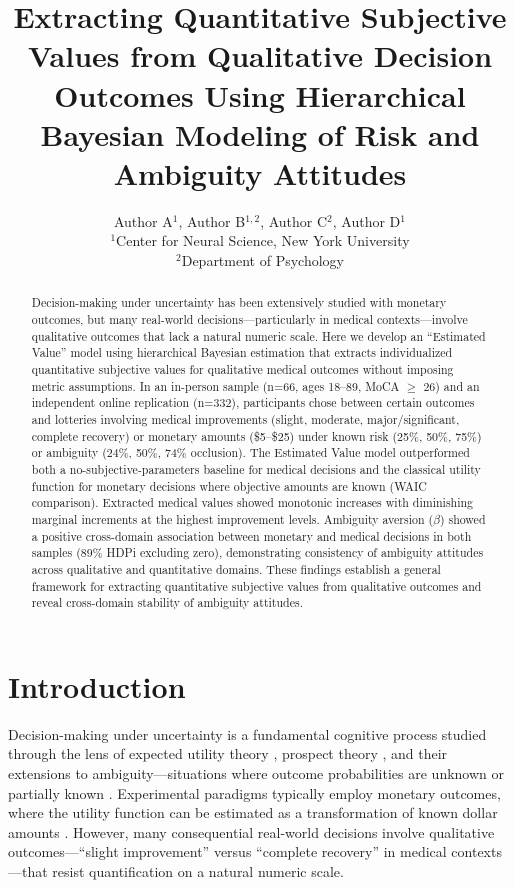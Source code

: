 \documentclass[11pt]{article}
\title{Extracting Quantitative Subjective Values from Qualitative Decision Outcomes Using Hierarchical Bayesian Modeling of Risk and Ambiguity Attitudes}
\author{Author A$^{1}$, Author B$^{1,2}$, Author C$^{2}$, Author D$^{1}$\\[6pt]
$^{1}$Center for Neural Science, New York University\\
$^{2}$Department of Psychology}
\date{}
\begin{document}
\maketitle

\begin{abstract}
Decision-making under uncertainty has been extensively studied with monetary outcomes, but many real-world decisions---particularly in medical contexts---involve qualitative outcomes that lack a natural numeric scale. Here we develop an ``Estimated Value'' model using hierarchical Bayesian estimation that extracts individualized quantitative subjective values for qualitative medical outcomes without imposing metric assumptions. In an in-person sample (n=66, ages 18--89, MoCA $\geq$ 26) and an independent online replication (n=332), participants chose between certain outcomes and lotteries involving medical improvements (slight, moderate, major/significant, complete recovery) or monetary amounts (\$5--\$25) under known risk (25\%, 50\%, 75\%) or ambiguity (24\%, 50\%, 74\% occlusion). The Estimated Value model outperformed both a no-subjective-parameters baseline for medical decisions and the classical utility function for monetary decisions where objective amounts are known (WAIC comparison). Extracted medical values showed monotonic increases with diminishing marginal increments at the highest improvement levels. Ambiguity aversion ($\beta$) showed a positive cross-domain association between monetary and medical decisions in both samples (89\% HDPi excluding zero), demonstrating consistency of ambiguity attitudes across qualitative and quantitative domains. These findings establish a general framework for extracting quantitative subjective values from qualitative outcomes and reveal cross-domain stability of ambiguity attitudes.
\end{abstract}

\section{Introduction}

Decision-making under uncertainty is a fundamental cognitive process studied through the lens of expected utility theory \citep{von1947theory}, prospect theory \citep{kahneman1979prospect, tversky1992advances}, and their extensions to ambiguity---situations where outcome probabilities are unknown or partially known \citep{ellsberg1961risk, trautmann2015ambiguity}. Experimental paradigms typically employ monetary outcomes, where the utility function can be estimated as a transformation of known dollar amounts \citep{levy2010neural, platt2010risky}. However, many consequential real-world decisions involve qualitative outcomes---``slight improvement'' versus ``complete recovery'' in medical contexts---that resist quantification on a natural numeric scale.
\end{document}
